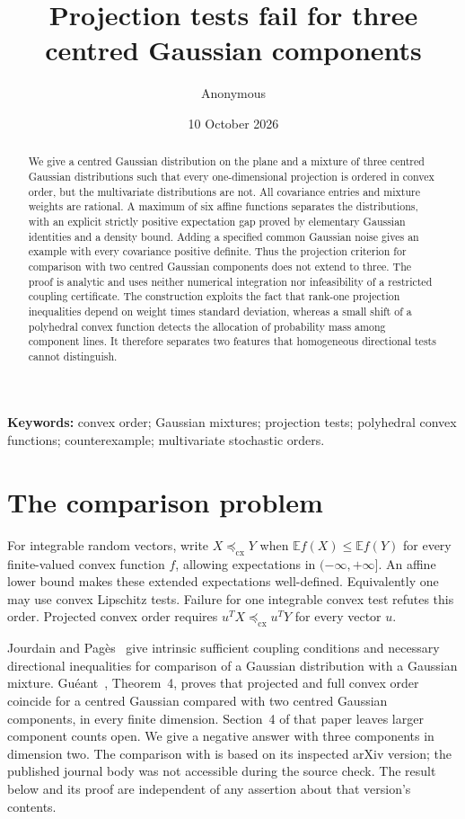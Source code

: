 \documentclass[11pt]{article}
\title{Projection tests fail for three centred Gaussian components}
\author{Anonymous}
\date{10 October 2026}
\newcommand{\E}{\mathbb E}
\newcommand{\cx}{\preceq_{\mathrm{cx}}}
\begin{document}
\maketitle
\begin{abstract}
We give a centred Gaussian distribution on the plane and a mixture of three centred Gaussian distributions such that every one-dimensional projection is ordered in convex order, but the multivariate distributions are not. All covariance entries and mixture weights are rational. A maximum of six affine functions separates the distributions, with an explicit strictly positive expectation gap proved by elementary Gaussian identities and a density bound. Adding a specified common Gaussian noise gives an example with every covariance positive definite. Thus the projection criterion for comparison with two centred Gaussian components does not extend to three. The proof is analytic and uses neither numerical integration nor infeasibility of a restricted coupling certificate. The construction exploits the fact that rank-one projection inequalities depend on weight times standard deviation, whereas a small shift of a polyhedral convex function detects the allocation of probability mass among component lines. It therefore separates two features that homogeneous directional tests cannot distinguish.
\end{abstract}
\noindent\textbf{Keywords:} convex order; Gaussian mixtures; projection tests; polyhedral convex functions; counterexample; multivariate stochastic orders.

\section{The comparison problem}
For integrable random vectors, write $X\cx Y$ when $\E f(X)\le\E f(Y)$ for every finite-valued convex function $f$, allowing expectations in $(-\infty,+\infty]$. An affine lower bound makes these extended expectations well-defined. Equivalently one may use convex Lipschitz tests. Failure for one integrable convex test refutes this order. Projected convex order requires $u^TX\cx u^TY$ for every vector $u$.

Jourdain and Pag\`es~\cite{JP} give intrinsic sufficient coupling conditions and necessary directional inequalities for comparison of a Gaussian distribution with a Gaussian mixture. Gu\'eant~\cite{G}, Theorem~4, proves that projected and full convex order coincide for a centred Gaussian compared with two centred Gaussian components, in every finite dimension. Section~4 of that paper leaves larger component counts open. We give a negative answer with three components in dimension two. The comparison with \cite{JP} is based on its inspected arXiv version; the published journal body was not accessible during the source check. The result below and its proof are independent of any assertion about that version's contents.
\end{document}
